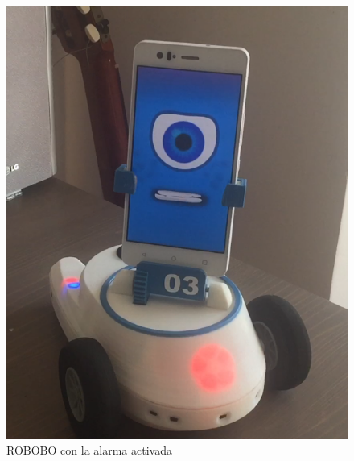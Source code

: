 \begin{figure}
\centering
\begin{minipage}{0.45\textwidth}
\centering
\includegraphics[width=1\linewidth]{imagenes/vigilante_alarm.png}
\caption{ROBOBO con la alarma activada}
\label{fig:vigilante-alarm}


\end{minipage}
\end{figure}
